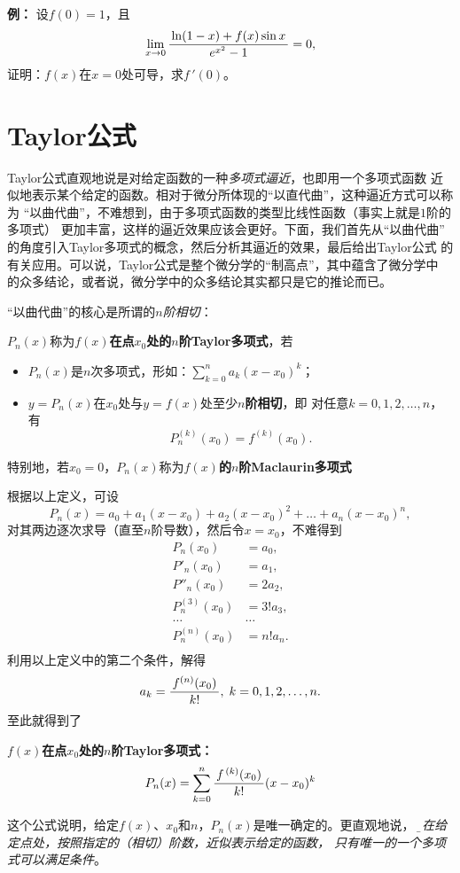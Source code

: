 {\bf 例：}
设$f(0)=1$，且
$$\lim\limits_{x\to{0}}\displaystyle\frac{\,{\ln(1-x)+f(x)\sin x}\,}{\,{e^{x^2}-1}\,}=0,$$
证明：$f(x)$在$x=0$处可导，求$f\,'(0)$。

\section{Taylor公式}

Taylor公式直观地说是对给定函数的一种{\it 多项式逼近}，也即用一个多项式函数
近似地表示某个给定的函数。相对于微分所体现的“以直代曲”，这种逼近方式可以称为
“以曲代曲”，不难想到，由于多项式函数的类型比线性函数（事实上就是$1$阶的多项式）
更加丰富，这样的逼近效果应该会更好。下面，我们首先从“以曲代曲”
的角度引入Taylor多项式的概念，然后分析其逼近的效果，最后给出Taylor公式
的有关应用。可以说，Taylor公式是整个微分学的“制高点”，其中蕴含了微分学中
的众多结论，或者说，微分学中的众多结论其实都只是它的推论而已。

“以曲代曲”的核心是所谓的{\it $n$阶相切}：

\begin{thx}
	$P_n(x)$称为{\bf $f(x)$在点$x_0$处的$n$阶Taylor多项式}，若
	\begin{itemize}
	  \item $P_n(x)$是$n$次多项式，形如：$\sum\limits_{k=0}^na_k(x-x_0)^k$；
	  \item $y=P_n(x)$在$x_0$处与$y=f(x)$处至少{\bf $n$阶相切}，即
	  对任意$k=0,1,2,\ldots,n$，有
	  $$P^{(k)}_n(x_0)=f^{(k)}(x_0).$$
	\end{itemize}
	特别地，若$x_0=0$，$P_n(x)$称为{\bf $f(x)$的$n$阶Maclaurin多项式}
\end{thx}

根据以上定义，可设
$$P_n(x)=a_0+a_1(x-x_0)+a_2(x-x_0)^2+\ldots+a_n(x-x_0)^n,$$
对其两边逐次求导（直至$n$阶导数），然后令$x=x_0$，不难得到
\begin{align*}
	P_n(x_0)&=a_0,\\
	P'_n(x_0)&=a_1,\\
	P''_n(x_0)&=2a_2,\\
	P^{(3)}_n(x_0)&=3!a_3,\\
	\ldots&\ldots\\
	P^{(n)}_n(x_0)&=n!a_n.\\
\end{align*}
利用以上定义中的第二个条件，解得
$$a_k=\displaystyle\frac{\,{f^{(n)}(x_0)}\,}{\,{k!}\,},\;k=0,1,2,\ldots,n.$$
至此就得到了
\begin{thx}
	{\bf $f(x)$在点$x_0$处的$n$阶Taylor多项式：}
	$$P_n(x)=\sum\limits_{k=0}^n\displaystyle\frac{\,{f^{\,(k)}(x_0)}\,}{\,{k!}\,}(x-x_0)^k$$
\end{thx}
这个公式说明，给定$f(x)$、$x_0$和$n$，$P_n(x)$是唯一确定的。更直观地说，
{\it\b 要在给定点处，按照指定的（相切）阶数，近似表示给定的函数，
只有唯一的一个多项式可以满足条件}。

